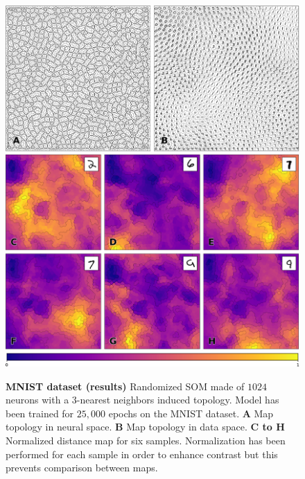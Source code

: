 \begin{figure}
  \includegraphics[width=\columnwidth]{experiment-MNIST.pdf}
  \vspace{2mm}
  \centering
  \includegraphics[width=.975\columnwidth]{figures/colormap.pdf}
  \caption{%
  {\bfseries \sffamily MNIST dataset (results)}
  Randomized SOM made of $1024$ neurons with a $3$-nearest neighbors induced topology. Model has been trained for $25,000$ epochs on the MNIST dataset. \textbf{A} Map topology in neural space. \textbf{B} Map topology in data space. \textbf{C to H} Normalized distance map for six samples. Normalization has been performed for each sample in order to enhance contrast but this prevents comparison between maps.
  }
  \label{fig:MNIST:results}
\end{figure}


